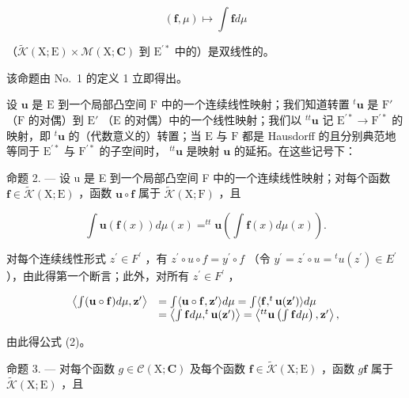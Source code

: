 \[
(\mathbf {f}, \mu) \mapsto \int \mathbf {f} d \mu
\]

（\(\widetilde{\mathcal{K}} (\mathrm{X};\mathrm{E})\times \mathcal{M}(\mathrm{X};\mathbf{C})\) 到 \(\mathrm{E}^{\prime *}\) 中的）是双线性的。

该命题由 No.~1 的定义 1 立即得出。

设 \(\mathbf{u}\) 是 \(\mathrm{E}\) 到一个局部凸空间 \(\mathrm{F}\) 中的一个连续线性映射；我们知道转置 \(^t\mathbf{u}\) 是 \(\mathrm{F}'\) （\(\mathrm{F}\) 的对偶）到 \(\mathrm{E}'\) （\(\mathrm{E}\) 的对偶）中的一个线性映射；我们以 \(^{tt}\mathbf{u}\) 记 \(\mathrm{E}^{\prime *} \to \mathrm{F}^{\prime *}\) 的映射，即 \(^t\mathbf{u}\) 的（代数意义的）转置；当 \(\mathrm{E}\) 与 \(\mathrm{F}\) 都是 Hausdorff 的且分别典范地等同于 \(\mathrm{E}^{\prime *}\) 与 \(\mathrm{F}^{\prime *}\) 的子空间时， \(^{tt}\mathbf{u}\) 是映射 \(\mathbf{u}\) 的延拓。在这些记号下：

命题 2. --- 设 u 是 E 到一个局部凸空间 F 中的一个连续线性映射；对每个函数 \(\mathbf{f} \in \widetilde{\mathcal{K}}(\mathrm{X};\mathrm{E})\) ，函数 \(\mathbf{u} \circ \mathbf{f}\) 属于 \(\widetilde{\mathcal{K}}(\mathrm{X};\mathrm{F})\) ，且

\[
\int \mathbf {u} (\mathbf {f} (x)) d \mu (x) = ^ {t t} \mathbf {u} \left(\int \mathbf {f} (x) d \mu (x)\right).\tag{2}
\]

对每个连续线性形式 \(z^{\prime} \in F^{\prime}\) ，有 \(z^{\prime} \circ u \circ f = y^{\prime} \circ f\) （令 \(y^{\prime} = z^{\prime} \circ u = {}^{t}u(z^{\prime}) \in E^{\prime}\) ），由此得第一个断言；此外，对所有 \(z^{\prime} \in F^{\prime}\) ，

\[
\begin{array}{r l} \left\langle \int (\mathbf {u} \circ \mathbf {f}) d \mu , \mathbf {z} ^ {\prime} \right\rangle & = \int \langle \mathbf {u} \circ \mathbf {f}, \mathbf {z} ^ {\prime} \rangle d \mu = \int \langle \mathbf {f}, ^ {t} \mathbf {u} (\mathbf {z} ^ {\prime}) \rangle d \mu \\ & = \left\langle \int \mathbf {f} d \mu , ^ {t} \mathbf {u} (\mathbf {z} ^ {\prime}) \right\rangle = \left\langle {} ^ {t t} \mathbf {u} \left(\int \mathbf {f} d \mu\right), \mathbf {z} ^ {\prime} \right\rangle , \end{array}
\]

由此得公式 (2)。

命题 3. --- 对每个函数 \(g \in \mathcal{C}(\mathrm{X};\mathbf{C})\) 及每个函数 \(\mathbf{f} \in \widetilde{\mathcal{K}}(\mathrm{X};\mathrm{E})\) ，函数 \(g\mathbf{f}\) 属于 \(\widetilde{\mathcal{K}}(\mathrm{X};\mathrm{E})\) ，且


